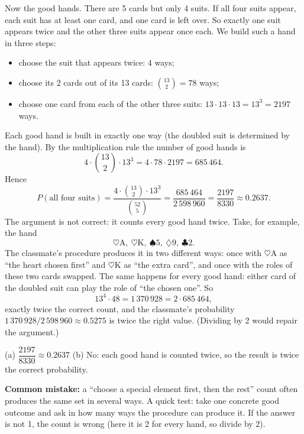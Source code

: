\begin{solution}
	Now the good hands. There are 5 cards but only 4 suits. If all four suits
	appear, each suit has at least one card, and one card is left over. So
	exactly one suit appears twice and the other three suits appear once each.
	We build such a hand in three steps:
	\begin{itemize}
		\item choose the suit that appears twice: $4$ ways;
		\item choose its 2 cards out of its 13 cards: $\binom{13}{2}=78$ ways;
		\item choose one card from each of the other three suits: $13\cdot13\cdot13=13^3=2197$ ways.
	\end{itemize}
	Each good hand is built in exactly one way (the doubled suit is determined
	by the hand). By the multiplication rule the number of good hands is
	\[ 4\cdot\binom{13}{2}\cdot13^3=4\cdot78\cdot2197=685\,464. \]
	Hence
	\[ P(\text{all four suits})=\frac{4\cdot\binom{13}{2}\cdot13^3}{\binom{52}{5}}
		=\frac{685\,464}{2\,598\,960}=\frac{2197}{8330}\approx0.2637. \]
	 The argument is not correct: it counts every good hand twice.
	Take, for example, the hand
	\[ \heartsuit\mathrm{A},\ \heartsuit\mathrm{K},\ \spadesuit 5,\ \diamondsuit 9,\ \clubsuit 2. \]
	The classmate's procedure produces it in two different ways: once with
	$\heartsuit\mathrm{A}$ as ``the heart chosen first'' and $\heartsuit\mathrm{K}$ as ``the
	extra card'', and once with the roles of these two cards swapped. The same
	happens for every good hand: either card of the doubled suit can play the
	role of ``the chosen one''. So
	\[ 13^4\cdot48=1\,370\,928=2\cdot685\,464, \]
	exactly twice the correct count, and the classmate's probability
	$1\,370\,928/2\,598\,960\approx0.5275$ is twice the right value.
	(Dividing by 2 would repair the argument.)
	\begin{answer}
		(a) $\dfrac{2197}{8330}\approx0.2637$ \quad (b) No: each good hand is
		counted twice, so the result is twice the correct probability.
	\end{answer}
	\begin{remark}
		\textbf{Common mistake:} a ``choose a special element first, then the
		rest'' count often produces the same set in several ways. A quick test:
		take one concrete good outcome and ask in how many ways the procedure
		can produce it. If the answer is not 1, the count is wrong (here it is
		2 for every hand, so divide by 2).
	\end{remark}
\end{solution}
